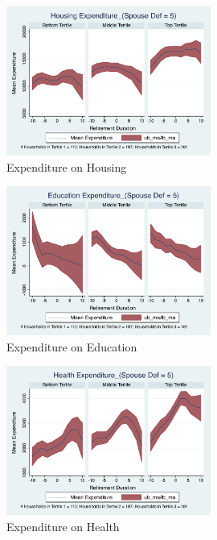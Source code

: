 \documentclass[11pt]{article}
\begin{document}
\clearpage

\begin{figure}[h]
	\caption{Expenditure on Housing}
	\centering
	\includegraphics[width=0.6\textwidth]{../ConsumptionPostRetirement_by_SpouseDef_Cats/Smoothed/5/spouse_def_total_housing_real.pdf}
\end{figure}


\begin{figure}[h]
	\caption{Expenditure on Education}
	\centering
	\includegraphics[width=0.6\textwidth]{../ConsumptionPostRetirement_by_SpouseDef_Cats/Smoothed/5/spouse_def_total_education_real.pdf}
\end{figure}
\clearpage

\begin{figure}[h]
	\caption{Expenditure on Health}
	\centering
	\includegraphics[width=0.6\textwidth]{../ConsumptionPostRetirement_by_SpouseDef_Cats/Smoothed/5/spouse_def_total_healthexpense_real.pdf}
\end{figure}
\end{document}
